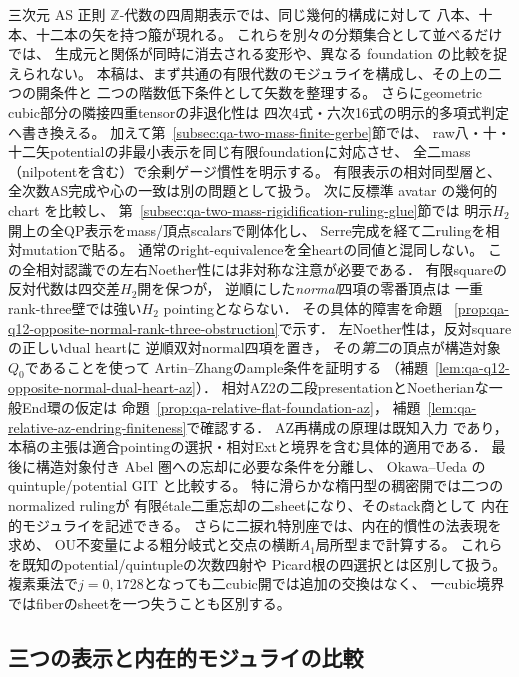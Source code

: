 \documentclass[a4paper,11pt]{ltjsarticle}
\numberwithin{equation}{section}
\theoremstyle{plain}
\theoremstyle{definition}
\theoremstyle{remark}
\begin{document}
三次元 AS 正則 $\mathbb Z$-代数の四周期表示では、同じ幾何的構成に対して
八本、十本、十二本の矢を持つ箙が現れる。
これらを別々の分類集合として並べるだけでは、
生成元と関係が同時に消去される変形や、異なる foundation の比較を捉えられない。
本稿は、まず共通の有限代数のモジュライを構成し、その上の二つの開条件と
二つの階数低下条件として矢数を整理する。
さらにgeometric cubic部分の隣接四重tensorの非退化性は
四次4式・六次16式の明示的多項式判定へ書き換える。
加えて第~\ref{subsec:qa-two-mass-finite-gerbe}節では、
raw八・十・十二矢potentialの非最小表示を同じ有限foundationに対応させ、
全二mass（nilpotentを含む）で余剰ゲージ慣性を明示する。
有限表示の相対同型層と、全次数AS完成や心の一致は別の問題として扱う。
次に反標準 avatar の幾何的 chart を比較し、
第~\ref{subsec:qa-two-mass-rigidification-ruling-glue}節では
明示$H_2$開上の全QP表示をmass/頂点scalarsで剛体化し、
Serre完成を経て二rulingを相対mutationで貼る。
通常のright-equivalenceを全heartの同値と混同しない。
この全相対認識での左右Noether性には非対称な注意が必要である．
有限squareの反対代数は四交差$H_2$開を保つが，
逆順にした\emph{normal}四項の零番頂点は
一重rank-three壁では強い$H_2$ pointingとならない．
その具体的障害を命題~
\ref{prop:qa-q12-opposite-normal-rank-three-obstruction}で示す．
左Noether性は，反対squareの正しいdual heartに
逆順双対normal四項を置き，
その\emph{第二}の頂点が構造対象$Q_0$であることを使って
Artin--Zhangのample条件を証明する
（補題~\ref{lem:qa-q12-opposite-normal-dual-heart-az}）．
相対AZ2の二段presentationとNoetherianな一般End環の仮定は
命題~\ref{prop:qa-relative-flat-foundation-az}，
補題~\ref{lem:qa-relative-az-endring-finiteness}で確認する．
AZ再構成の原理は既知入力
\cite[Theorem 4.5(1)]{AZ1994}
\cite[Theorem 7.3]{OACU2026}であり，
本稿の主張は適合pointingの選択・相対Extと境界を含む具体的適用である．
最後に構造対象付き Abel 圏への忘却に必要な条件を分離し、
Okawa--Ueda の quintuple/potential GIT と比較する。
特に滑らかな楕円型の稠密開では二つのnormalized rulingが
有限étale二重忘却の二sheetになり、そのstack商として
内在的モジュライを記述できる。
さらに二捩れ特別座では、内在的慣性の法表現を求め、
OU不変量による粗分岐式と交点の横断$A_1$局所型まで計算する。
これらを既知のpotential/quintupleの次数四射や
Picard根の四選択とは区別して扱う。
複素乗法で$j=0,1728$となっても二cubic開では追加の交換はなく、
一cubic境界ではfiberのsheetを一つ失うことも区別する。

\subsection{三つの表示と内在的モジュライの比較}
\end{document}
